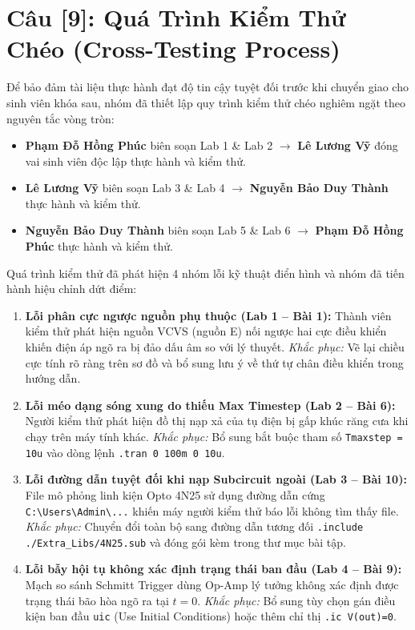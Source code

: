 \documentclass[12pt,a4paper]{report}
\begin{document}
\section*{Câu [9]: Quá Trình Kiểm Thử Chéo (Cross-Testing Process)}

Để bảo đảm tài liệu thực hành đạt độ tin cậy tuyệt đối trước khi chuyển giao cho sinh viên khóa sau, nhóm đã thiết lập quy trình kiểm thử chéo nghiêm ngặt theo nguyên tắc vòng tròn:
\begin{itemize}[noitemsep]
    \item \textbf{Phạm Đỗ Hồng Phúc} biên soạn Lab 1 \& Lab 2 $\longrightarrow$ \textbf{Lê Lương Vỹ} đóng vai sinh viên độc lập thực hành và kiểm thử.
    \item \textbf{Lê Lương Vỹ} biên soạn Lab 3 \& Lab 4 $\longrightarrow$ \textbf{Nguyễn Bảo Duy Thành} thực hành và kiểm thử.
    \item \textbf{Nguyễn Bảo Duy Thành} biên soạn Lab 5 \& Lab 6 $\longrightarrow$ \textbf{Phạm Đỗ Hồng Phúc} thực hành và kiểm thử.
\end{itemize}

Quá trình kiểm thử đã phát hiện 4 nhóm lỗi kỹ thuật điển hình và nhóm đã tiến hành hiệu chỉnh dứt điểm:
\begin{enumerate}
    \item \textbf{Lỗi phân cực ngược nguồn phụ thuộc (Lab 1 -- Bài 1):} Thành viên kiểm thử phát hiện nguồn VCVS (nguồn E) nối ngược hai cực điều khiển khiến điện áp ngõ ra bị đảo dấu âm so với lý thuyết. \textit{Khắc phục:} Vẽ lại chiều cực tính rõ ràng trên sơ đồ và bổ sung lưu ý về thứ tự chân điều khiển trong hướng dẫn.
    \item \textbf{Lỗi méo dạng sóng xung do thiếu Max Timestep (Lab 2 -- Bài 6):} Người kiểm thử phát hiện đồ thị nạp xả của tụ điện bị gấp khúc răng cưa khi chạy trên máy tính khác. \textit{Khắc phục:} Bổ sung bắt buộc tham số \lstinline|Tmaxstep = 10u| vào dòng lệnh \lstinline|.tran 0 100m 0 10u|.
    \item \textbf{Lỗi đường dẫn tuyệt đối khi nạp Subcircuit ngoài (Lab 3 -- Bài 10):} File mô phỏng linh kiện Opto 4N25 sử dụng đường dẫn cứng \lstinline|C:\Users\Admin\...| khiến máy người kiểm thử báo lỗi không tìm thấy file. \textit{Khắc phục:} Chuyển đổi toàn bộ sang đường dẫn tương đối \lstinline|.include ./Extra_Libs/4N25.sub| và đóng gói kèm trong thư mục bài tập.
    \item \textbf{Lỗi bẫy hội tụ không xác định trạng thái ban đầu (Lab 4 -- Bài 9):} Mạch so sánh Schmitt Trigger dùng Op-Amp lý tưởng không xác định được trạng thái bão hòa ngõ ra tại $t=0$. \textit{Khắc phục:} Bổ sung tùy chọn gán điều kiện ban đầu \lstinline|uic| (Use Initial Conditions) hoặc thêm chỉ thị \lstinline|.ic V(out)=0|.
\end{enumerate}
\end{document}
